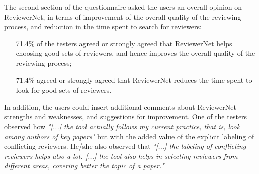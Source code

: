 The second section of the questionnaire asked the users an overall opinion on ReviewerNet, in terms of improvement of the overall quality of the reviewing process, and reduction in the time spent to search for reviewers:  %
%
\begin{itemize}
\item [71.4\%] of the testers agreed or strongly agreed that ReviewerNet helps choosing good sets of reviewers, and hence improves the overall quality of the reviewing process;
\item [71.4\%] agreed or strongly agreed that ReviewerNet reduces the time spent to look for good sets of reviewers. 
\end{itemize}

In addition, the users could insert additional comments about ReviewerNet strengths and weaknesses, and suggestions for improvement.
One of the testers observed how {\em "[...] the tool actually follows my current practice, that is, look among authors of key papers"} but with the added value of the explicit labeling of conflicting reviewers. He/she also observed that {\em "[...] the labeling of conflicting reviewers helps also a lot. [...] the tool also helps in selecting reviewers from different areas, covering better the topic of a paper."}




